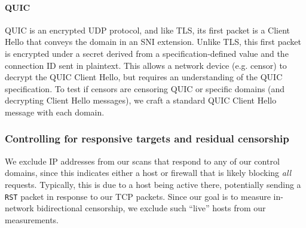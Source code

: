 \paragraph{QUIC} QUIC is an encrypted UDP protocol, and like TLS, its first
packet is a Client Hello that conveys the domain in an SNI extension. Unlike
TLS, this first packet is encrypted under a secret derived from a
specification-defined value and the connection ID sent in plaintext. This allows
a network device (e.g. censor) to decrypt the QUIC Client Hello, but requires an
understanding of the QUIC specification. To test if censors are censoring QUIC
or specific domains (and decrypting Client Hello messages), we craft a standard
QUIC Client Hello message with each domain.
\fi




\subsubsection{Controlling for responsive targets and residual censorship}
We exclude IP addresses from our scans that respond to any of our control
domains, since this indicates either a host or firewall that is likely blocking
\emph{all} requests. Typically, this is due to a host being active there,
potentially sending a \texttt{RST} packet in response to our TCP packets. Since
our goal is to measure in-network bidirectional censorship, we exclude such
``live'' hosts from our measurements.

